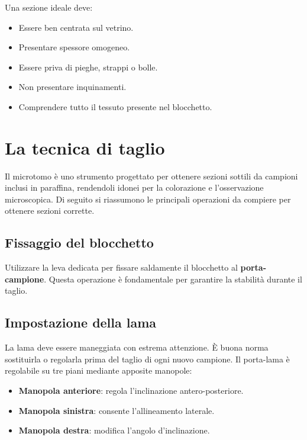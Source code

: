 Una sezione ideale deve:

\begin{itemize}
    \item Essere ben centrata sul vetrino.
    \item Presentare spessore omogeneo.
    \item Essere priva di pieghe, strappi o bolle.
    \item Non presentare inquinamenti.
    \item Comprendere tutto il tessuto presente nel blocchetto.
\end{itemize}

\section{La tecnica di taglio}

Il microtomo è uno strumento progettato per ottenere sezioni sottili da campioni inclusi in paraffina, rendendoli idonei per la colorazione e l'osservazione microscopica. Di seguito si riassumono le principali operazioni da compiere per ottenere sezioni corrette.

\subsection{Fissaggio del blocchetto}

Utilizzare la leva dedicata per fissare saldamente il blocchetto al \textbf{porta-campione}. Questa operazione è fondamentale per garantire la stabilità durante il taglio.


\subsection{Impostazione della lama}

La lama deve essere maneggiata con estrema attenzione. È buona norma sostituirla o regolarla prima del taglio di ogni nuovo campione. Il porta-lama è regolabile su tre piani mediante apposite manopole:

\begin{itemize}
    \item \textbf{Manopola anteriore}: regola l'inclinazione antero-posteriore.
    \item \textbf{Manopola sinistra}: consente l'allineamento laterale.
    \item \textbf{Manopola destra}: modifica l'angolo d'inclinazione.
\end{itemize}

